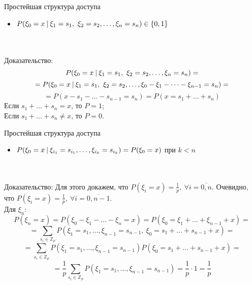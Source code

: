 \documentclass{beamer}
\begin{document}
\begin{frame}{Простейшая структура доступа}
\begin{itemize}
    \item 
    \(P(\xi_0 = x \ \vline \ \xi_1 = s_1, \ \xi_2 = s_2, \dots, \xi_n = s_n) \in \{0, 1\}\)
\end{itemize} \\ \ \\
    Доказательство:
    \[
        P(\xi_0 = x \ \vline \ \xi_1 = s_1, \ \xi_2 = s_2, \dots, \xi_n = s_n) = 
        \]
        \[
        = P(\xi_0 = x \ \vline \ \xi_1 = s_1, \ \xi_2 = s_2, \dots, \xi_0 - \xi_1 - \dots - \xi_{n - 1} = s_n) =
        \]
        \[
        = P(x - s_1 - \dots - s_{n - 1} = s_n) = P(x = s_1 + \dots + s_n)
        \]
        Если \(s_1 + \dots + s_n = x\), то \(P = 1\); \\
        Если \(s_1 + \dots + s_n \neq x\), то \(P = 0\). \\
\end{frame}

\begin{frame}{Простейшая структура доступа}
    \begin{itemize}
        \item \(P(\xi_0 = x \ \vline \ \xi_{i_1} = s_{i_1}, \dots, \xi_{i_k} = s_{i_k}) = P(\xi_0 = x)\) при \(k < n\)
    \end{itemize}
    \\ \ \\
    Доказательство: Для этого докажем, что \(P(\xi_i = x) = \frac{1}{p}, \ \forall i = \overline{0, n}\). Очевидно, что \(P(\xi_i = x) = \frac{1}{p}, \ \forall i = \overline{0, n - 1}\). \\Для \(\xi_n\):
    \[P(\xi_n = x) = P(\xi_0 - \xi_1 - \dots - \xi_n = x) = P(\xi_0 = \xi_1 + \dots + \xi_{n-1} + x) = \]
    \[
    = \sum_{s_i \in \mathbb{Z}_p} P(\xi_1 = s_1, \dots, \xi_{n - 1} = s_{n-1}, \ \xi_0 = s_1 + \dots + s_{n -1 } + x) = 
    \]
    \[
    = \sum_{s_i \in \mathbb{Z}_p} P(\xi_1 = s_1, \dots, \xi_{n - 1} = s_{n-1}) P(\xi_0 = s_1 + \dots + s_{n -1 } + x) = 
    \]
    \[
    = \frac{1}{p} \sum_{s_i \in \mathbb{Z}_p} P(\xi_1 = s_1, \dots, \xi_{n - 1} = s_{n-1}) = \frac{1}{p} \cdot 1 = \frac{1}{p}
    \]
\end{frame}
\end{document}

